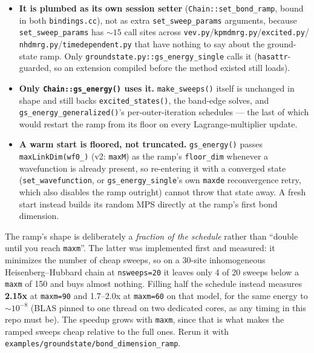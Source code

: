 \documentclass[11pt]{article}
\begin{document}
\begin{itemize}
  \item \textbf{It is plumbed as its own session setter}
    (\texttt{Chain::set\_bond\_ramp}, bound in both
    \texttt{bindings.cc}), not as extra \texttt{set\_sweep\_params}
    arguments, because \texttt{set\_sweep\_params} has ${\sim}15$ call
    sites across \texttt{vev.py}/\texttt{kpmdmrg.py}/\texttt{excited.py}/
    \texttt{nhdmrg.py}/\texttt{timedependent.py} that have nothing to say
    about the ground-state ramp. Only
    \texttt{groundstate.py::gs\_energy\_single} calls it
    (\texttt{hasattr}-guarded, so an extension compiled before the method
    existed still loads).
  \item \textbf{Only \texttt{Chain::gs\_energy()} uses it.}
    \texttt{make\_sweeps()} itself is unchanged in shape and still backs
    \texttt{excited\_states()}, the band-edge solves, and
    \texttt{gs\_energy\_generalized()}'s per-outer-iteration schedules ---
    the last of which would restart the ramp from its floor on every
    Lagrange-multiplier update.
  \item \textbf{A warm start is floored, not truncated.}
    \texttt{gs\_energy()} passes \texttt{maxLinkDim(wf0\_)} (v2:
    \texttt{maxM}) as the ramp's \texttt{floor\_dim} whenever a
    wavefunction is already present, so re-entering it with a converged
    state (\texttt{set\_wavefunction}, or \texttt{gs\_energy\_single}'s
    own \texttt{maxde} reconvergence retry, which also disables the ramp
    outright) cannot throw that state away. A fresh start instead builds
    its random MPS directly at the ramp's first bond dimension.
\end{itemize}

The ramp's shape is deliberately a \emph{fraction of the schedule} rather
than ``double until you reach \texttt{maxm}''. The latter was implemented
first and measured: it minimizes the number of cheap sweeps, so on a
30-site inhomogeneous Heisenberg--Hubbard chain at \texttt{nsweeps=20} it
leaves only 4 of 20 sweeps below a \texttt{maxm} of 150 and buys almost
nothing. Filling half the schedule instead measures \textbf{2.15x} at
\texttt{maxm=90} and 1.7--2.0x at \texttt{maxm=60} on that model, for the
same energy to ${\sim}10^{-8}$ (BLAS pinned to one thread on two dedicated
cores, as any timing in this repo must be). The speedup grows with
\texttt{maxm}, since that is what makes the ramped sweeps cheap relative
to the full ones. Rerun it with
\texttt{examples/groundstate/bond\_dimension\_ramp}.
\end{document}
